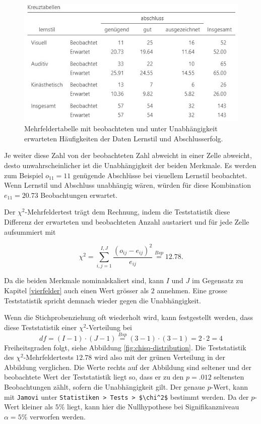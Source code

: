 \documentclass[
]{book}
\theoremstyle{definition}
\theoremstyle{definition}
\theoremstyle{definition}
\theoremstyle{definition}
\theoremstyle{remark}
\begin{document}
\begin{figure}

{\centering \includegraphics{figures/10-exm-learning-style-data-view-expected} 

}

\caption{Mehrfeldertabelle mit beobachteten und unter Unabhängigkeit erwarteten Häufigkeiten der Daten Lernstil und Abschlusserfolg.}\label{fig:exm-learning-style-data-view-expected}
\end{figure}

Je weiter diese Zahl von der beobachteten Zahl abweicht in einer Zelle abweicht, desto unwahrscheinlicher ist die Unabhängigkeit der beiden Merkmale. Es werden zum Beispiel \(o_{11}=11\) genügende Abschlüsse bei visuellem Lernstil beobachtet. Wenn Lernstil und Abschluss unabhängig wären, würden für diese Kombination \(e_{11} =20.73\) Beobachtungen erwartet.

Der \(\chi^2\)-Mehrfeldertest trägt dem Rechnung, indem die Teststatistik diese Differenz der erwarteten und beobachteten Anzahl austariert und für jede Zelle aufsummiert mit

\[\chi^2 = \sum_{i,j = 1}^{I,J} \frac{(o_{ij} - e_{ij})^2}{e_{ij}} \overset{Bsp}{=}  12.78.\]

Da die beiden Merkmale nominalskaliert sind, kann \(I\) und \(J\) im Gegensatz zu Kapitel \ref{vierfelder} auch einen Wert grösser als \(2\) annehmen. Eine grosse Teststatistik spricht demnach wieder gegen die Unabhängigkeit.

Wenn die Stichprobenziehung oft wiederholt wird, kann festgestellt
werden, dass diese Teststatistik einer \(\chi^2\)-Verteilung bei
\[df = (I-1)\cdot (J-1) \overset{Bsp}{=} (3-1)\cdot (3-1) = 2\cdot 2 = 4\]
Freiheitsgraden folgt, siehe Abbildung \ref{fig:chisq-distribution}. Die Teststatistik des \(\chi^2\)-Mehrfeldertests \(12.78\) wird also mit
der grünen Verteilung in der Abbildung verglichen. Die Werte rechts auf
der Abbildung sind seltener und der beobachtete Wert der Teststatistik liegt so, dass er zu den \(p = .012\) seltensten Beobachtungen zählt, sofern die Unabhängigkeit gilt. Der genaue \(p\)-Wert, kann mit \texttt{Jamovi} unter \texttt{Statistiken\ \textgreater{}\ Tests\ \textgreater{}\ \$\textbackslash{}chi\^{}2\$} bestimmt werden. Da der \(p\)-Wert kleiner als \(5\%\) liegt, kann hier die Nullhypothese bei Signifikanzniveau \(\alpha = 5\%\) verworfen werden.
\end{document}
